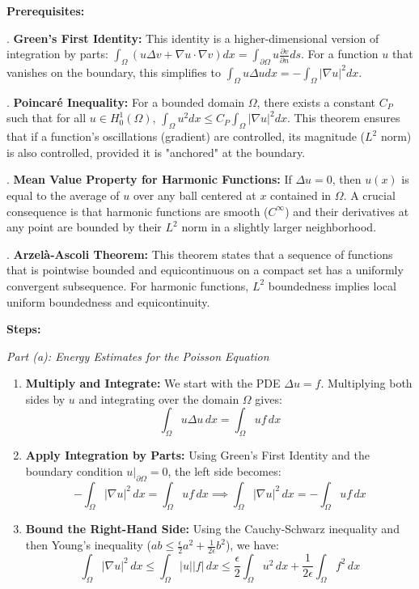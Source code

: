 \begin{solution}
\textbf{Prerequisites:}
\par{}. \textbf{Green's First Identity:} This identity is a higher-dimensional version of integration by parts: $\int_\Omega (u \Delta v + \nabla u \cdot \nabla v) dx = \int_{\partial \Omega} u \frac{\partial v}{\partial n} ds$. For a function $u$ that vanishes on the boundary, this simplifies to $\int_\Omega u \Delta u dx = -\int_\Omega |\nabla u|^2 dx$.
\par{}. \textbf{Poincaré Inequality:} For a bounded domain $\Omega$, there exists a constant $C_P$ such that for all $u \in H_0^1(\Omega)$, $\int_\Omega u^2 dx \leq C_P \int_\Omega |\nabla u|^2 dx$. This theorem ensures that if a function's oscillations (gradient) are controlled, its magnitude ($L^2$ norm) is also controlled, provided it is "anchored" at the boundary.
\par{}. \textbf{Mean Value Property for Harmonic Functions:} If $\Delta u = 0$, then $u(x)$ is equal to the average of $u$ over any ball centered at $x$ contained in $\Omega$. A crucial consequence is that harmonic functions are smooth ($C^\infty$) and their derivatives at any point are bounded by their $L^2$ norm in a slightly larger neighborhood.
\par{}. \textbf{Arzelà-Ascoli Theorem:} This theorem states that a sequence of functions that is pointwise bounded and equicontinuous on a compact set has a uniformly convergent subsequence. For harmonic functions, $L^2$ boundedness implies local uniform boundedness and equicontinuity.
\par\medskip
\textbf{Steps:}

\textit{Part (a): Energy Estimates for the Poisson Equation}
\begin{enumerate}
    \item \textbf{Multiply and Integrate:} We start with the PDE $\Delta u = f$. Multiplying both sides by $u$ and integrating over the domain $\Omega$ gives:
    \[ \int_\Omega u \Delta u \, dx = \int_\Omega u f \, dx \]

    \item \textbf{Apply Integration by Parts:} Using Green's First Identity and the boundary condition $u|_{\partial \Omega} = 0$, the left side becomes:
    \[ -\int_\Omega |\nabla u|^2 \, dx = \int_\Omega u f \, dx \implies \int_\Omega |\nabla u|^2 \, dx = -\int_\Omega u f \, dx \]

    \item \textbf{Bound the Right-Hand Side:} Using the Cauchy-Schwarz inequality and then Young's inequality ($ab \leq \frac{\epsilon}{2} a^2 + \frac{1}{2\epsilon} b^2$), we have:
    \[ \int_\Omega |\nabla u|^2 \, dx \leq \int_\Omega |u||f| \, dx \leq \frac{\epsilon}{2} \int_\Omega u^2 \, dx + \frac{1}{2\epsilon} \int_\Omega f^2 \, dx \]


\end{enumerate}
\end{solution}
